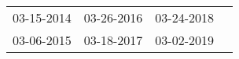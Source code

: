 \begin{supertabular}{llll}
 03-15-2014 &  03-26-2016 &  03-24-2018 \\
 03-06-2015 &  03-18-2017 &  03-02-2019 \\
\end{supertabular}
